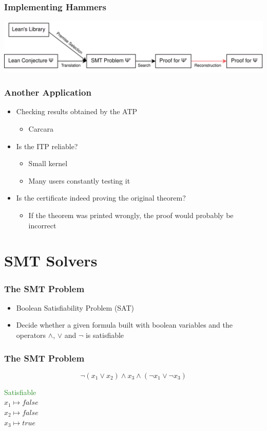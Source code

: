 \documentclass[usepdftitle=false,aspectratio=169,usenames,dvipsnames]{beamer}
\newcommand\vitem{\vfill\item}
\begin{document}
\begin{frame}
  \frametitle{Implementing Hammers}
  \centering
  \includegraphics[height=0.3\textheight]{images/pic4.png}
\end{frame}

\begin{frame}
  \frametitle{Another Application}
  \begin{itemize}
    \item Checking results obtained by the ATP
    \begin{itemize}
      \item Carcara
    \end{itemize}
    \vitem Is the ITP reliable?
    \begin{itemize}
      \item Small kernel
      \item Many users constantly testing it
    \end{itemize}
    \vitem Is the certificate indeed proving the original theorem?
    \begin{itemize}
        \item If the theorem was printed wrongly, the proof would probably be incorrect
    \end{itemize}
  \end{itemize}
\end{frame}

\section{SMT Solvers}

\begin{frame}
  \frametitle{The SMT Problem}
  \begin{itemize}
    \item Boolean Satisfiability Problem (SAT)
    \vitem Decide whether a given formula built with boolean variables and the operators $\wedge$, $\vee$ and $\neg$ is satisfiable
  \end{itemize}
\end{frame}


\begin{frame}
  \frametitle{The SMT Problem}
  \begin{overprint}
    \medskip
    $$\neg (x_{1} \vee x_{2}) \wedge x_{3} \wedge (\neg x_{1} \vee \neg x_{3})$$
  \end{overprint}
  \vfill
  \begin{overprint}
    \begin{center}
      \textcolor{ForestGreen}{Satisfiable}\\
    $x_{1} \mapsto false$ \\
    $x_{2} \mapsto false$ \\
    $x_{3} \mapsto true$
    \end{center}
  \end{overprint}
\end{frame}
\end{document}
